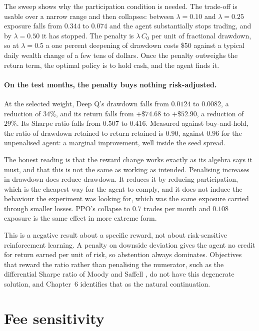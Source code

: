 The sweep shows why the participation condition is needed. The trade-off is
usable over a narrow range and then collapses: between $\lambda = 0.10$ and
$\lambda = 0.25$ exposure falls from $0.344$ to $0.074$ and the agent
substantially stops trading, and by $\lambda = 0.50$ it has stopped. The penalty
is $\lambda\,C_0$ per unit of fractional drawdown, so at $\lambda = 0.5$ a one
percent deepening of drawdown costs \$50 against a typical daily wealth change of
a few tens of dollars. Once the penalty outweighs the return term, the optimal
policy is to hold cash, and the agent finds it.

\paragraph{On the test months, the penalty buys nothing risk-adjusted.} At the
selected weight, Deep Q's drawdown falls from $0.0124$ to $0.0082$, a reduction
of $34\%$, and its return falls from $+\$74.68$ to $+\$52.90$, a reduction of
$29\%$. Its Sharpe ratio falls from $0.507$ to $0.416$. Measured against
buy-and-hold, the ratio of drawdown retained to return retained is $0.90$,
against $0.96$ for the unpenalised agent: a marginal improvement, well inside the
seed spread.

The honest reading is that the reward change works exactly as its algebra says it
must, and that this is not the same as working as intended. Penalising increases
in drawdown does reduce drawdown. It reduces it by reducing participation, which
is the cheapest way for the agent to comply, and it does not induce the behaviour
the experiment was looking for, which was the same exposure carried through
smaller losses. PPO's collapse to $0.7$ trades per month and $0.108$ exposure is
the same effect in more extreme form.

This is a negative result about a specific reward, not about risk-sensitive
reinforcement learning. A penalty on downside deviation gives the agent no credit
for return earned per unit of risk, so abstention always dominates. Objectives
that reward the ratio rather than penalising the numerator, such as the
differential Sharpe ratio of Moody and Saffell \cite{moody2001}, do not have this
degenerate solution, and Chapter~6 identifies that as the natural continuation.

\section{Fee sensitivity}
\label{sec:res_fees}

